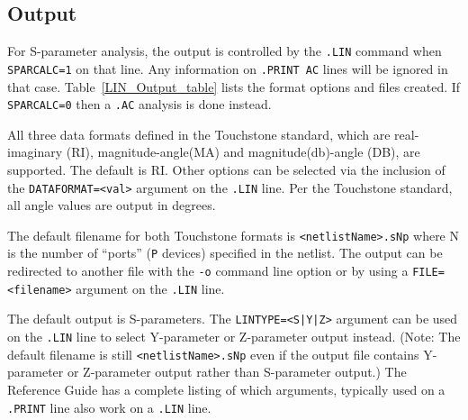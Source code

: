 \subsection{Output}
\label{LIN_Output}
For S-parameter analysis, the output is controlled by the \texttt{.LIN}
command when \texttt{SPARCALC=1} on that line.  Any information on
\texttt{.PRINT AC} lines will be ignored in that case.
Table~\ref{LIN_Output_table} lists the format options and files created.
If \texttt{SPARCALC=0} then a \texttt{.AC} analysis is done instead.

All three data formats defined in the Touchstone standard, which are
real-imaginary (RI), magnitude-angle(MA) and magnitude(db)-angle (DB),
are supported.  The default is RI.  Other options can be selected via
the inclusion of the \texttt{DATAFORMAT=<val>} argument on the
\texttt{.LIN} line. Per the Touchstone standard, all angle values are
output in degrees.

The default filename for both Touchstone formats is
\texttt{<netlistName>.sNp} where N is the number of ``ports''
(\texttt{P} devices) specified in the netlist.  The output can be
redirected to another file with the \texttt{-o} command line option or
by using a \texttt{FILE=<filename>} argument on the \texttt{.LIN}
line.

The default output is S-parameters.  The \texttt{LINTYPE=<S|Y|Z>}
argument can be used on the \texttt{.LIN} line to select Y-parameter
or Z-parameter output instead.  (Note: The default filename is still
\texttt{<netlistName>.sNp} even if the output file contains
Y-parameter or Z-parameter output rather than S-parameter output.)
The \Xyce{} Reference Guide\ReferenceGuide{} has a complete listing of
which arguments, typically used on a \texttt{.PRINT} line also work on
a \texttt{.LIN} line.

